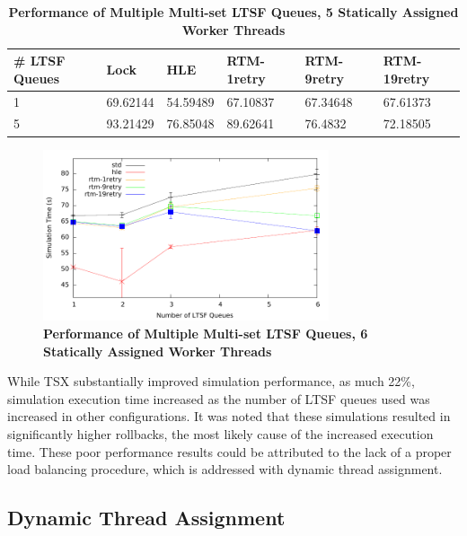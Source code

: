 \documentclass[11pt]{book}
\begin{document}
\begin{table}
    \centering
    \begin{tabular}{l|p{2cm}|p{2cm}|p{2cm}|p{2cm}|p{2cm}}
        \textbf{\# LTSF Queues}&Lock &HLE &RTM-1retry &RTM-9retry &RTM-19retry \\
        \hline
        \midrule
            1 &69.62144  &54.59489 &67.10837 &67.34648 &67.61373\\ 
            5 &93.21429  &76.85048 &89.62641 &76.4832  &72.18505\\
    \end{tabular}
    \caption{\textbf{Performance of Multiple Multi-set LTSF Queues, 5 Statically Assigned Worker Threads}}
    \label{tab:noThrMig_5threadsXschq}
\end{table}

\begin{figure}
    \centering
    \graphicspath{ {./figures/} }
    \includegraphics[width=0.75\textwidth,keepaspectratio]{hugeepidemicsim-NOmig-timeVSschedQs-multiset-6thread}
    \caption{\textbf{Performance of Multiple Multi-set LTSF Queues, 6 Statically Assigned Worker Threads}}
    \label{fig:noThrMig_timeVSschq_6threads}
\end{figure}

While TSX substantially improved simulation performance, as much 22\%,
simulation execution time increased as the number of LTSF queues used was
increased in other configurations.  It was noted that these simulations resulted
in significantly higher rollbacks, the most likely cause of the increased
execution time.  These poor performance results could be attributed to the lack
of a proper load balancing procedure, which is addressed with dynamic thread
assignment.

\subsection{Dynamic Thread Assignment}
\end{document}
